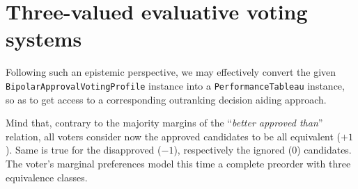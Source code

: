 \section{Three-valued evaluative voting systems}
\label{sec:20.4}

Following such an epistemic perspective, we may effectively convert the given \texttt{BipolarApprovalVotingProfile} instance into a \texttt{PerformanceTableau} instance, so as to get access to a corresponding outranking decision aiding approach.

Mind that, contrary to the majority margins of the ``\emph{better approved than}'' relation, all voters consider now the approved candidates to be all equivalent ($+1$). Same is true for the disapproved ($-1$), respectively the ignored ($0$) candidates. The voter's marginal preferences model this time a complete preorder with three equivalence classes. 

